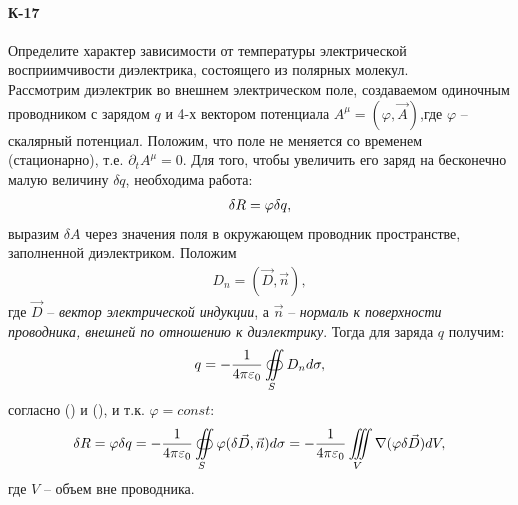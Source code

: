 \documentclass[__main__.tex]{subfiles}
\begin{document}
\paragraph{К-17}
Определите характер зависимости от температуры электрической восприимчивости диэлектрика, состоящего из полярных молекул.\\

Рассмотрим диэлектрик во внешнем электрическом поле, создаваемом одиночным проводником с зарядом $q$ и 4-х вектором потенциала $A^\mu=(\varphi,\vec{A})$,где $\varphi$ -- скалярный потенциал. Положим, что поле не меняется со временем (стационарно), т.е. $\partial_t A^\mu=0$. Для того, чтобы увеличить его заряд на бесконечно малую величину $\delta q$, необходима работа:
\begin{gather}
\delta R = \varphi\delta q,\llabel{eq:work}
\end{gather}
выразим $\delta A$ через значения поля в окружающем проводник пространстве, заполненной диэлектриком. Положим
\begin{gather}
D_n = (\vec{D},\vec{n}),
\end{gather}
где $\vec{D}$ -- \emph{вектор электрической индукции}, а $\vec{n}$ -- \emph{нормаль к поверхности проводника, внешней по отношению к диэлектрику}. Тогда для заряда $q$ получим:
\begin{gather}
q = -\frac{1}{4\pi\varepsilon_0}\oiint\limits_{S}D_n d\sigma,\llabel{eq:q}
\end{gather}
согласно () и (), и т.к. $\varphi=const$:
\begin{gather}
\delta R = \varphi\delta q =
-\frac{1}{4\pi\varepsilon_0}\oiint\limits_{S}\varphi(\delta\vec{D},\vec{n})d\sigma =
-\frac{1}{4\pi\varepsilon_0}\iiint\limits_{V}\nabla(\varphi\delta\vec{D})dV, \llabel{eq:workq}
\end{gather}
где $V$ -- объем вне проводника.
\end{document}
